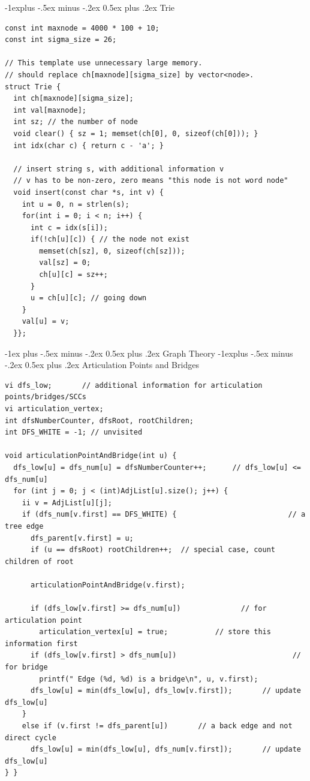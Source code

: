 \documentclass[10pt,landscape]{article}
\makeatletter
\renewcommand{\section}{\@startsection{section}{1}{0mm}%
                                {-1ex plus -.5ex minus -.2ex}%
                                {0.5ex plus .2ex}%
                                {\normalfont\large\bfseries}}
\renewcommand{\subsection}{\@startsection{subsection}{2}{0mm}%
                                {-1explus -.5ex minus -.2ex}%
                                {0.5ex plus .2ex}%
                                {\normalfont\normalsize\bfseries}}
\makeatother
\begin{document}
\begin{multicols}{2}
\subsection{Trie}
\begin{lstlisting}
const int maxnode = 4000 * 100 + 10;
const int sigma_size = 26;

// This template use unnecessary large memory.
// should replace ch[maxnode][sigma_size] by vector<node>.
struct Trie {
  int ch[maxnode][sigma_size];
  int val[maxnode];
  int sz; // the number of node
  void clear() { sz = 1; memset(ch[0], 0, sizeof(ch[0])); }
  int idx(char c) { return c - 'a'; }

  // insert string s, with additional information v
  // v has to be non-zero, zero means "this node is not word node" 
  void insert(const char *s, int v) {
    int u = 0, n = strlen(s);
    for(int i = 0; i < n; i++) {
      int c = idx(s[i]);
      if(!ch[u][c]) { // the node not exist
        memset(ch[sz], 0, sizeof(ch[sz]));
        val[sz] = 0;
        ch[u][c] = sz++;
      }
      u = ch[u][c]; // going down
    }
    val[u] = v;
  }};
\end{lstlisting}

\section{Graph Theory}
\subsection{Articulation Points and Bridges}
\begin{lstlisting}
vi dfs_low;       // additional information for articulation points/bridges/SCCs
vi articulation_vertex;
int dfsNumberCounter, dfsRoot, rootChildren;
int DFS_WHITE = -1; // unvisited

void articulationPointAndBridge(int u) {
  dfs_low[u] = dfs_num[u] = dfsNumberCounter++;      // dfs_low[u] <= dfs_num[u]
  for (int j = 0; j < (int)AdjList[u].size(); j++) {
    ii v = AdjList[u][j];
    if (dfs_num[v.first] == DFS_WHITE) {                          // a tree edge
      dfs_parent[v.first] = u;
      if (u == dfsRoot) rootChildren++;  // special case, count children of root

      articulationPointAndBridge(v.first);

      if (dfs_low[v.first] >= dfs_num[u])              // for articulation point
        articulation_vertex[u] = true;           // store this information first
      if (dfs_low[v.first] > dfs_num[u])                           // for bridge
        printf(" Edge (%d, %d) is a bridge\n", u, v.first);
      dfs_low[u] = min(dfs_low[u], dfs_low[v.first]);       // update dfs_low[u]
    }
    else if (v.first != dfs_parent[u])       // a back edge and not direct cycle
      dfs_low[u] = min(dfs_low[u], dfs_num[v.first]);       // update dfs_low[u]
} }


\end{lstlisting}
\end{multicols}
\end{document}
